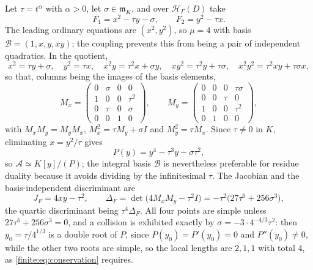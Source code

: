 \documentclass[11pt,letterpaper]{article}
\theoremstyle{definition}
\theoremstyle{remark}
\newcommand{\HH}{\mathscr H}
\newcommand{\Alg}{\mathcal A}
\newcommand{\mm}{\mathfrak m}
\newcommand{\bx}{\mathcal B}
\numberwithin{equation}{section}
\begin{document}
Let $\tau=t^\alpha$ with $\alpha>0$, let $\sigma\in\mm_K$, and over $\HH_\Gamma(D)$ take
\begin{equation}\label{finite:eq:exampleF}
 F_1=x^2-\tau y-\sigma,
 \qquad
 F_2=y^2-\tau x .
\end{equation}
The leading ordinary equations are $(x^2,y^2)$, so $\mu=4$ with basis $\bx=(1,x,y,xy)$; the coupling prevents this from being a pair of independent quadratics. In the quotient,
\[
 x^2=\tau y+\sigma,\quad y^2=\tau x,\quad
 x^2y=\tau^2x+\sigma y,\quad xy^2=\tau^2y+\tau\sigma,\quad
 x^2y^2=\tau^2xy+\tau\sigma x,
\]
so that, columns being the images of the basis elements,
\begin{equation}\label{finite:eq:examplematrices}
 M_x=\begin{pmatrix}0&\sigma&0&0\\1&0&0&\tau^2\\0&\tau&0&\sigma\\0&0&1&0\end{pmatrix},
 \qquad
 M_y=\begin{pmatrix}0&0&0&\tau\sigma\\0&0&\tau&0\\1&0&0&\tau^2\\0&1&0&0\end{pmatrix},
\end{equation}
with $M_xM_y=M_yM_x$, $M_x^2=\tau M_y+\sigma I$ and $M_y^2=\tau M_x$. Since $\tau\neq0$ in $K$, eliminating $x=y^2/\tau$ gives
\begin{equation}\label{finite:eq:quarticP}
 P(y)=y^4-\tau^3y-\sigma\tau^2,
\end{equation}
so $\Alg\simeq K[y]/(P)$; the integral basis $\bx$ is nevertheless preferable for residue duality because it avoids dividing by the infinitesimal $\tau$. The Jacobian and the basis-independent discriminant are
\begin{equation}\label{finite:eq:examplejacdisc}
 J_F=4xy-\tau^2,
 \qquad
 \Delta_F=\det\bigl(4M_xM_y-\tau^2I\bigr)=-\tau^2\bigl(27\tau^6+256\sigma^3\bigr),
\end{equation}
the quartic discriminant being $\tau^4\Delta_F$. All four points are simple unless $27\tau^6+256\sigma^3=0$, and a collision is exhibited exactly by $\sigma=-3\cdot4^{-4/3}\tau^2$: then $y_0=\tau/4^{1/3}$ is a double root of $P$, since $P(y_0)=P'(y_0)=0$ and $P''(y_0)\neq0$, while the other two roots are simple, so the local lengths are $2,1,1$ with total $4$, as \eqref{finite:eq:conservation} requires.
\end{document}

